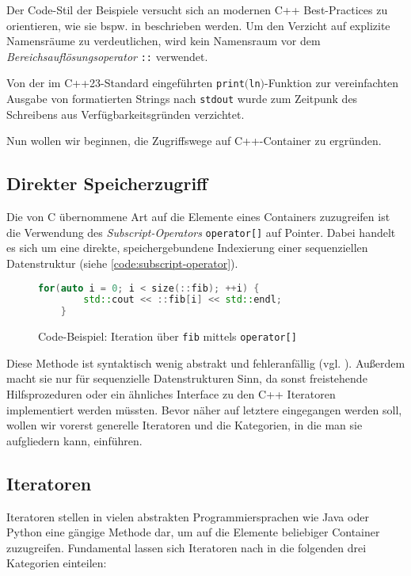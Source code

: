 \documentclass[runningheads]{llncs}
\begin{document}
Der Code-Stil der Beispiele versucht sich an modernen C++ Best-Practices zu orientieren, wie sie bspw. in \cite{profcpp} beschrieben werden.
Um den Verzicht auf explizite Namensräume zu verdeutlichen, wird kein Namensraum vor dem \textit{Bereichsauflösungsoperator} \texttt{::} verwendet.

Von der im C++23-Standard eingeführten \texttt{print$($ln$)$}-Funktion zur vereinfachten Ausgabe von formatierten Strings nach \texttt{stdout} wurde zum Zeitpunk des Schreibens aus Verfügbarkeitsgründen verzichtet.

Nun wollen wir beginnen, die Zugriffswege auf C++-Container zu ergründen.

\subsection{Direkter Speicherzugriff}

Die von C übernommene Art auf die Elemente eines Containers zuzugreifen ist die Verwendung des \textit{Subscript-Operators} \texttt{operator[]} auf Pointer. %
Dabei handelt es sich um eine direkte, speichergebundene Indexierung einer sequenziellen Datenstruktur (siehe \autoref{code:subscript-operator}).

\begin{figure}[H]
	\vspace{-1em}
	\centering
	\caption{Code-Beispiel: Iteration über \texttt{fib} mittels \texttt{operator[]}}
	\label{code:subscript-operator}
	\begin{lstlisting}[language=C++]
	for(auto i = 0; i < size(::fib); ++i) {
		std::cout << ::fib[i] << std::endl;
	}\end{lstlisting}
	\vspace{-1.5em}
\end{figure}

\noindent Diese Methode ist syntaktisch wenig abstrakt und fehleranfällig (vgl. \cite[S.274]{plp}).
Außerdem macht sie nur für sequenzielle Datenstrukturen Sinn, da sonst freistehende Hilfsprozeduren oder ein ähnliches Interface zu den C++ Iteratoren implementiert werden müssten.
Bevor näher auf letztere eingegangen werden soll, wollen wir vorerst generelle Iteratoren und die Kategorien, in die man sie aufgliedern kann, einführen.

\subsection{Iteratoren}

Iteratoren stellen in vielen abstrakten Programmiersprachen wie Java oder Python eine gängige Methode dar, um auf die Elemente beliebiger Container zuzugreifen.
Fundamental lassen sich Iteratoren nach \cite[S.269ff.]{plp} in die folgenden drei Kategorien einteilen:
\end{document}
